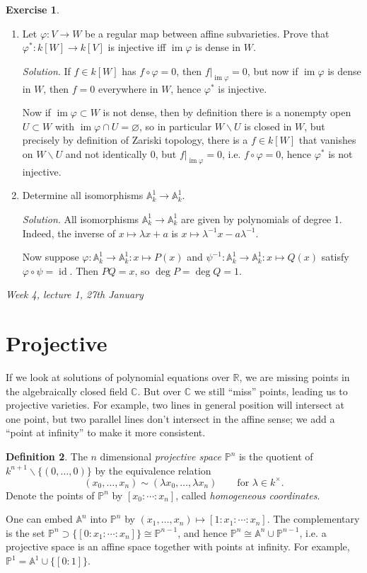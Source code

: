 \documentclass{article}
\newcommand{\R}{\mathbb{R}}
\newcommand{\C}{\mathbb{C}}
\newcommand{\A}{\mathbb{A}}
\newcommand{\p}{\mathbb{P}}
\newcommand{\id}{\operatorname{id}}
\newcommand{\im}{\operatorname{im}}
\theoremstyle{definition}
\newtheorem{defn}{Definition}[subsection]
\newtheorem{exe}[defn]{Exercise}
\begin{document}
\begin{exe}
\begin{enumerate}
\item Let $\varphi:V\rightarrow W$ be a regular map between affine subvarieties. Prove that $\varphi^\ast:k[W]\rightarrow k[V]$ is injective iff $\im\varphi$ is dense in $W$.

\textit{Solution}. If $f\in k[W]$ has $f\circ\varphi=0$, then $\left. f\right|_{\im\varphi}=0$, but now if $\im\varphi$ is dense in $W$, then $f=0$ everywhere in $W$, hence $\varphi^\ast$ is injective.

Now if $\im\varphi\subset W$ is not dense, then by definition there is a nonempty open $U\subset W$ with $\im\varphi\cap U=\varnothing$, so in particular $W\backslash U$ is closed in $W$, but precisely by definition of Zariski topology, there is a $f\in k[W]$ that vanishes on $W\backslash U$ and not identically 0, but $\left. f\right|_{\im\varphi}=0$, i.e. $f\circ\varphi=0$, hence $\varphi^\ast$ is not injective.

\item Determine all isomorphisms $\A_k^1\rightarrow\A_k^1$.
\label{allA1iso}

\textit{Solution}. All isomorphisms $\A_k^1\rightarrow\A_k^1$ are given by polynomials of degree 1. Indeed, the inverse of $x\mapsto\lambda x+a$ is $x\mapsto\lambda^{-1}x-a\lambda^{-1}$.

Now suppose $\varphi:\A_k^1\rightarrow\A_k^1:x\mapsto P(x)$ and $\psi^{-1}:\A_k^1\rightarrow\A_k^1:x\mapsto Q(x)$ satisfy $\varphi\circ\psi=\id$. Then $PQ=x$, so $\deg P=\deg Q=1$.
\end{enumerate}
\end{exe}

\begin{flushright}
\textit{Week 4, lecture 1, 27th January}
\end{flushright}

\section{Projective}
If we look at solutions of polynomial equations over $\R$, we are missing points in the algebraically closed field $\C$. But over $\C$ we still ``miss'' points, leading us to projective varieties. For example, two lines in general position will intersect at one point, but two parallel lines don't intersect in the affine sense; we add a ``point at infinity'' to make it more consistent.

\begin{defn}
The $n$ dimensional \textit{projective space} $\p^n$ is the quotient of $k^{n+1}\backslash\{(0,\ldots,0)\}$ by the equivalence relation
\[
(x_0,\ldots,x_n)\sim(\lambda x_0,\ldots,\lambda x_n)\qquad\text{for }\lambda\in k^\times.
\]
Denote the points of $\p^n$ by $[x_0:\cdots:x_n]$, called \textit{homogeneous coordinates}.
\end{defn}
One can embed $\A^n$ into $\p^n$ by $(x_1,\ldots,x_n)\mapsto [1:x_1:\cdots:x_n]$. The complementary is the set $\p^n\supset\{[0:x_1:\cdots:x_n]\}\cong\p^{n-1}$, and hence $\p^n\cong\A^n\cup\p^{n-1}$, i.e. a projective space is an affine space together with points at infinity. For example, $\p^1=\A^1\cup\{[0:1]\}$.
\end{document}
